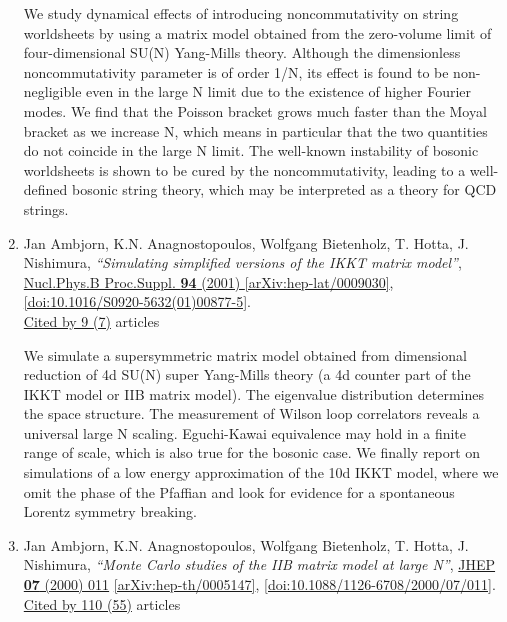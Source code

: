 \documentclass[a4paper,10pt]{article}
\begin{document}
\begin{enumerate}
We study dynamical effects of introducing noncommutativity on string worldsheets by using a matrix model obtained from the zero-volume limit of four-dimensional SU(N) Yang-Mills theory. Although the dimensionless noncommutativity parameter is of order 1/N, its effect is found to be non-negligible even in the large N limit due to the existence of higher Fourier modes. We find that the Poisson bracket grows much faster than the Moyal bracket as we increase N, which means in particular that the two quantities do not coincide in the large N limit. The well-known instability of bosonic worldsheets is shown to be cured by the noncommutativity, leading to a well-defined bosonic string theory, which may be interpreted as a theory for QCD strings.
\item Jan Ambjorn, K.N. Anagnostopoulos, Wolfgang Bietenholz, T. Hotta, J. Nishimura, {\it ``Simulating simplified versions of the IKKT matrix model''}, \href{https://www.doi.org/10.1016/S0920-5632(01)00877-5}{Nucl.Phys.B Proc.Suppl. {\bf 94} (2001) } \href{https://arxiv.org/abs/hep-lat/0009030}{[arXiv:hep-lat/0009030]}, \href{https://www.doi.org/10.1016/S0920-5632(01)00877-5}{[doi:10.1016/S0920-5632(01)00877-5]}.
\\\href{https://inspirehep.net/literature/?q=refersto%3Arecid%3A534033}{Cited by 9 (7)} articles

We simulate a supersymmetric matrix model obtained from dimensional reduction of 4d SU(N) super Yang-Mills theory (a 4d counter part of the IKKT model or IIB matrix model). The eigenvalue distribution determines the space structure. The measurement of Wilson loop correlators reveals a universal large N scaling. Eguchi-Kawai equivalence may hold in a finite range of scale, which is also true for the bosonic case. We finally report on simulations of a low energy approximation of the 10d IKKT model, where we omit the phase of the Pfaffian and look for evidence for a spontaneous Lorentz symmetry breaking.
\item Jan Ambjorn, K.N. Anagnostopoulos, Wolfgang Bietenholz, T. Hotta, J. Nishimura, {\it ``Monte Carlo studies of the IIB matrix model at large N''}, \href{https://www.doi.org/10.1088/1126-6708/2000/07/011}{JHEP {\bf 07} (2000) 011} \href{https://arxiv.org/abs/hep-th/0005147}{[arXiv:hep-th/0005147]}, \href{https://www.doi.org/10.1088/1126-6708/2000/07/011}{[doi:10.1088/1126-6708/2000/07/011]}.
\\\href{https://inspirehep.net/literature/?q=refersto%3Arecid%3A527438}{Cited by 110 (55)} articles


\end{enumerate}
\end{document}
